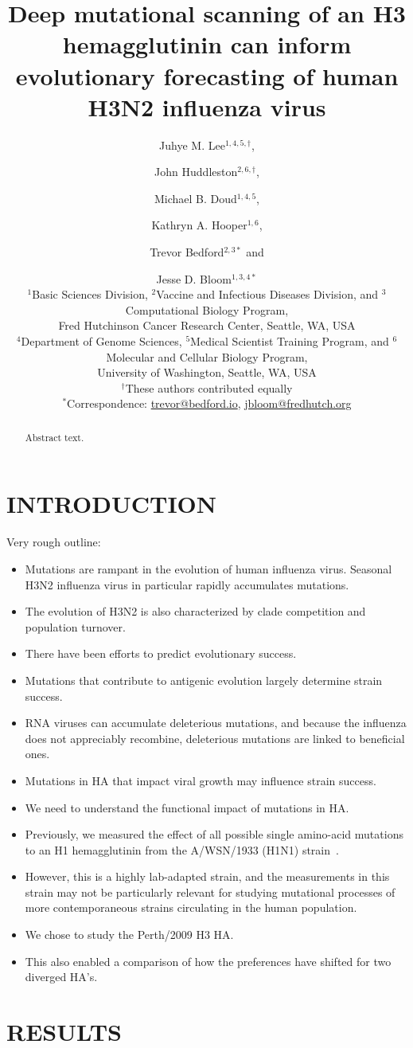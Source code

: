 \documentclass[11pt]{article}
\title{Deep mutational scanning of an H3 hemagglutinin can inform evolutionary forecasting of human H3N2 influenza virus}
\author{
Juhye M. Lee$^{1,4,5,\dagger}$, \and 
John Huddleston$^{2,6,\dagger}$, \and 
Michael B. Doud$^{1,4,5}$, \and 
Kathryn A. Hooper$^{1,6}$, \and
Trevor Bedford$^{2,3*}$ and \and 
Jesse D. Bloom$^{1,3,4*}$
\\
\scriptsize{$^1$Basic Sciences Division, $^2$Vaccine and Infectious Diseases Division, and $^3$Computational Biology Program,} \\
\scriptsize{Fred Hutchinson Cancer Research Center, Seattle, WA, USA} \\
\scriptsize{$^4$Department of Genome Sciences, $^5$Medical Scientist Training Program, and $^6$Molecular and Cellular Biology Program,} \\
\scriptsize{University of Washington, Seattle, WA, USA} \\
\scriptsize{$^{\dagger}$These authors contributed equally} \\
\scriptsize{$^*$Correspondence: \href{trevor@bedford.io}{trevor@bedford.io}, \href{jbloom@fredhutch.org}{jbloom@fredhutch.org}}
}
\date{}
\begin{document}
\maketitle
\onehalfspacing

\begin{abstract}
Abstract text.
\end{abstract}

\section*{INTRODUCTION}
Very rough outline:
\begin{itemize}
\item Mutations are rampant in the evolution of human influenza virus. Seasonal H3N2 influenza virus in particular rapidly accumulates mutations.
\item The evolution of H3N2 is also characterized by clade competition and population turnover.
\item There have been efforts to predict evolutionary success.
\item Mutations that contribute to antigenic evolution largely determine strain success.
\item RNA viruses can accumulate deleterious mutations, and because the influenza does not appreciably recombine, deleterious mutations are linked to beneficial ones.
\item Mutations in HA that impact viral growth may influence strain success.
\item We need to understand the functional impact of mutations in HA.
\item Previously, we measured the effect of all possible single amino-acid mutations to an H1 hemagglutinin from the A/WSN/1933 (H1N1) strain~\citep{thyagarajan2014inherent,doud2016accurate}. 
\item However, this is a highly lab-adapted strain, and the measurements in this strain may not be particularly relevant for studying mutational processes of more contemporaneous strains circulating in the human population.
\item We chose to study the Perth/2009 H3 HA.
\item This also enabled a comparison of how the preferences have shifted for two diverged HA's.
\end{itemize}

\section*{RESULTS}
\label{sec:results}
\end{document}

